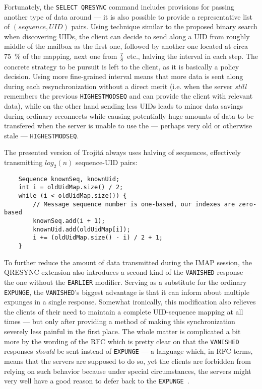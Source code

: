 \documentclass[trojita]{subfiles}
\begin{document}
Fortunately, the {\tt SELECT QRESYNC} command includes provisions for passing another type of data around --- it is also
possible to provide a representative list of $(sequence, UID)$ pairs.  Using technique similar to the proposed binary
search when discovering UIDs, the client can decide to send along a UID from roughly middle of the mailbox as the first
one, followed by another one located at circa 75~\% of the mapping, next one from $7 \over 8$ etc., halving the interval
in each step.  The concrete strategy to be pursuit is left to the client, as it is basically a policy decision.  Using
more fine-grained interval means that more data is sent along during each resynchronization without a direct merit (i.e.
when the server {\em still} remembers the previous {\tt HIGHESTMODSEQ} and can provide the client with relevant data),
while on the other hand sending less UIDs leads to minor data savings during ordinary reconnects while causing
potentially huge amounts of data to be transfered when the server is unable to use the --- perhaps very old or otherwise
stale --- {\tt HIGHESTMODSEQ}.

The presented version of Trojitá always uses halving of sequences, effectively transmitting $log_2(n)$ sequence-UID
pairs:

\begin{verbatim}
    Sequence knownSeq, knownUid;
    int i = oldUidMap.size() / 2;
    while (i < oldUidMap.size()) {
        // Message sequence number is one-based, our indexes are zero-based
        knownSeq.add(i + 1);
        knownUid.add(oldUidMap[i]);
        i += (oldUidMap.size() - i) / 2 + 1;
    }
\end{verbatim}

To further reduce the amount of data transmitted during the IMAP session, the QRESYNC extension also introduces a second
kind of the {\tt VANISHED} response --- the one without the {\tt EARLIER} modifier.  Serving as a substitute for the
ordinary {\tt EXPUNGE}, the {\tt VANISHED}'s biggest advantage is that it can inform about multiple expunges in a single
response.  Somewhat ironically, this modification also relieves the clients of their need to maintain a complete
UID-sequence mapping at all times --- but only after providing a method of making this synchronization severely less
painful in the first place.  The whole matter is complicated a bit more by the wording of the RFC which is pretty clear
on that the {\tt VANISHED} responses {\em should} be sent instead of {\tt EXPUNGE} --- a language which, in RFC terms,
means that the servers are supposed to do so, yet the clients are forbidden from relying on such behavior because under
special circumstances, the servers might very well have a good reason to defer back to the {\tt EXPUNGE}~\cite{rfc2119}.
\end{document}
